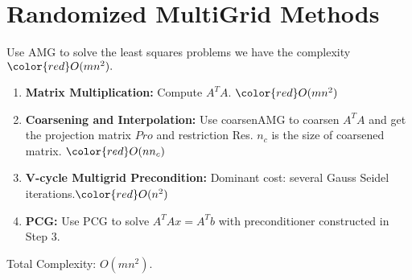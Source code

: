 \section{Randomized MultiGrid Methods}
Use AMG to solve the least squares problems we have the complexity ${\color{red} O(mn^2)}. $
\begin{tcolorbox}
\begin{enumerate}
\item \textbf{Matrix Multiplication:} Compute $A^TA$. \quad ${\color{red} O(mn^2)} $ \\
\item \textbf{Coarsening and Interpolation:} Use coarsenAMG to coarsen $A^TA$ and get the projection matrix $Pro$ and restriction Res. $n_c$ is the size of coarsened matrix.
\quad${\color{red} O(n n_c)}$
\\
\item \textbf{V-cycle Multigrid Precondition:} Dominant cost: several Gauss Seidel iterations.\quad${\color{red} O(n^2)}$ \\
\item \textbf{PCG:} Use PCG to solve $A^TA x = A^Tb$ with preconditioner constructed in Step 3.
\end{enumerate}
{\color{red} Total Complexity: $O(mn^2).$}
\end{tcolorbox}
